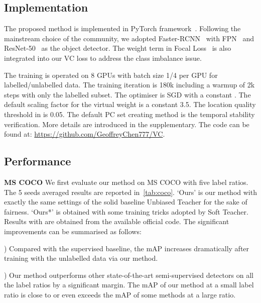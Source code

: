 \documentclass[runningheads]{llncs}
\begin{document}
\subsection{Implementation}
The proposed method is implemented in PyTorch framework~\cite{Adam_2019_PyT}. Following the mainstream choice of the community, we adopted Faster-RCNN~\cite{Shaoqing_2017_Fas} with FPN~\cite{Tsung-Yi_2017_Fea} and ResNet-50~\cite{Kaiming_2016_Dee} as the object detector. The weight term in Focal Loss~\cite{Tsung-Yi_2020_Foc} is also integrated into our VC loss to address the class imbalance issue.

The training is operated on 8 GPUs with batch size 1/4 per GPU for labelled/unlabelled data. The training iteration is 180k including a warmup of 2k steps with only the labelled subset. The optimiser is SGD with a constant . The default scaling factor for the virtual weight is a constant 3.5. The location quality threshold  in  is 0.05. The default PC set creating method is the temporal stability verification. More details are introduced in the supplementary. The code can be found at: \href{https://github.com/GeoffreyChen777/VC}{https://github.com/GeoffreyChen777/VC}.

\subsection{Performance}
\noindent\textbf{MS COCO} We first evaluate our method on MS COCO with five label ratios. The 5 seeds averaged results are reported in~\cref{tab:coco}. `Ours' is our method with exactly the same settings of the solid baseline Unbiased Teacher for the sake of fairness. `Ours*' is obtained with some training tricks adopted by Soft Teacher. Results with  are obtained from the available official code. The significant improvements can be summarised as follows:

) Compared with the supervised baseline, the mAP increases dramatically after training with the unlabelled data via our method.

) Our method outperforms other state-of-the-art semi-supervised detectors on all the label ratios by a significant margin. The mAP of our method at a small label ratio is close to or even exceeds the mAP of some methods at a large ratio.
\end{document}
